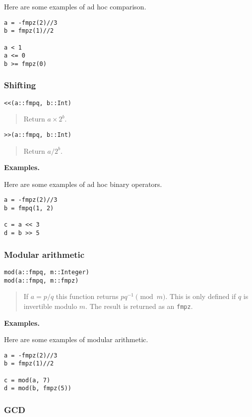 \documentclass[a4paper,10pt]{article}
\newcommand{\code}{\lstinline}
\newcommand{\desc}[1]{\vspace{-3mm}\begin{quote}#1\end{quote}}
\begin{document}
{{Here are some examples of ad hoc comparison.

\begin{lstlisting}
a = -fmpz(2)//3
b = fmpz(1)//2

a < 1
a <= 0
b >= fmpz(0)
\end{lstlisting}

\subsubsection{Shifting}

\begin{lstlisting}
<<(a::fmpq, b::Int)
\end{lstlisting}

\desc{Return $a\times 2^b$.}

\begin{lstlisting}
>>(a::fmpq, b::Int)
\end{lstlisting}

\desc{Return $a/2^b$.}

\textbf{Examples.}

Here are some examples of ad hoc binary operators.

\begin{lstlisting}
a = -fmpz(2)//3
b = fmpq(1, 2)

c = a << 3
d = b >> 5
\end{lstlisting}

\subsubsection{Modular arithmetic}

\begin{lstlisting}
mod(a::fmpq, m::Integer)
mod(a::fmpq, m::fmpz)
\end{lstlisting}

\desc{If $a = p/q$ this function returns $pq^{-1} \pmod{m}$. This is only
defined if $q$ is invertible modulo $m$. The result is returned as an \code{fmpz}.}

\textbf{Examples.}

Here are some examples of modular arithmetic.

\begin{lstlisting}
a = -fmpz(2)//3
b = fmpz(1)//2

c = mod(a, 7)
d = mod(b, fmpz(5))
\end{lstlisting}

\subsubsection{GCD}

}}
\end{document}
